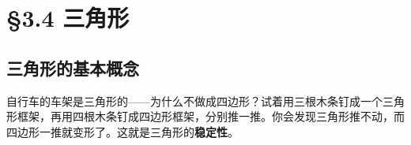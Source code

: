 \chapter{§3.4 三角形}
\label{sec:3.4}





\section*{三角形的基本概念}


\begin{explore}


自行车的车架是三角形的——为什么不做成四边形？试着用三根木条钉成一个三角形框架，再用四根木条钉成四边形框架，分别推一推。你会发现三角形推不动，而四边形一推就变形了。这就是三角形的\textbf{稳定性}。

\end{explore}

